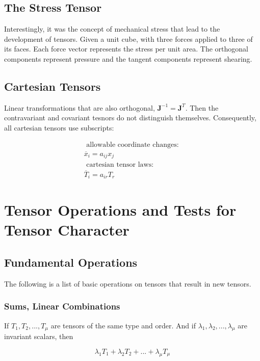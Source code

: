 \documentclass{article}
\begin{document}
\subsection{The Stress Tensor}
Interestingly, it was the concept of mechanical stress that lead to the development of tensors.  Given a unit cube, with three forces applied to three of its faces.
Each force vector represents the stress per unit area.  The orthogonal components represent pressure and the tangent components represent shearing.

\subsection{Cartesian Tensors}
Linear transformations that are also orthogonal, $\mathbf{ J }^{-1} = \mathbf{ J }^T$.  Then the contravariant and covariant tesnors do not distinguish themselves.  Consequently, all cartesian tensors use subscripts:

\begin{align*}
	\text{ allowable coordinate changes: }\\
	\overline{ x }_i = a_{ij} x_j\\
	\text{ cartesian tensor laws: }\\
	\overline{ T }_i = a_{ir} T_r
\end{align*}




%
%
\newpage
\section{Tensor Operations and Tests for Tensor Character}

\subsection{Fundamental Operations}

The following is a list of basic operations on tensors that result in new tensors.

\subsubsection{Sums, Linear Combinations}

If $T_1, T_2, ..., T_{\mu}$ are tensors of the same type and order.  And if $\lambda_1, \lambda_2, ..., \lambda_{\mu}$ are invariant scalars, then 

\begin{equation*}
	\lambda_1 T_1 + \lambda_2 T_2 + ... + \lambda_{\mu} T_{\mu}
\end{equation*}
\end{document}
